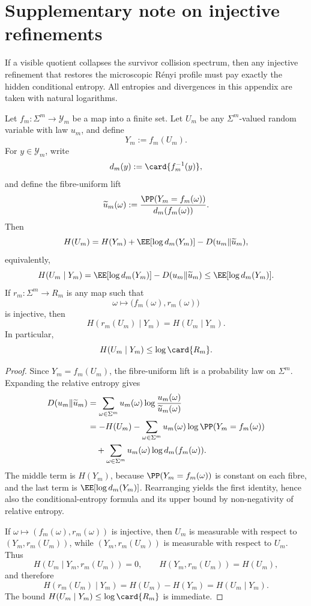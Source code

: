\section{Supplementary note on injective refinements}
\label{app:injective-refinements}

If a visible quotient collapses the survivor collision spectrum, then any
injective refinement that restores the microscopic R\'enyi profile must
pay exactly the hidden conditional entropy.  All entropies and
divergences in this appendix are taken with natural logarithms.

\begin{theorem}
\label{thm:entropy-ledger}
Let \(f_m:\Sigma^m\to \mathcal{Y}_m\) be a map into a finite set.  Let
\(U_m\) be any \(\Sigma^m\)-valued random variable with law \(u_m\), and
define
\[
  Y_m:=f_m(U_m).
\]
For \(y\in \mathcal{Y}_m\), write
\[
  d_m(y):=\card{f_m^{-1}(y)},
\]
and define the fibre-uniform lift
\[
  \widetilde u_m(\omega)
  := \frac{\PP(Y_m=f_m(\omega))}
           {d_m(f_m(\omega))}.
\]
Then
\[
  H(U_m)
  = H(Y_m)+\EE[\log d_m(Y_m)]-D(u_m\Vert \widetilde u_m),
\]
equivalently,
\[
  H(U_m\mid Y_m)
  = \EE[\log d_m(Y_m)]-D(u_m\Vert \widetilde u_m)
  \leq \EE[\log d_m(Y_m)].
\]
If \(r_m:\Sigma^m\to R_m\) is any map such that
\[
  \omega\longmapsto \bigl(f_m(\omega),r_m(\omega)\bigr)
\]
is injective, then
\[
  H(r_m(U_m)\mid Y_m)=H(U_m\mid Y_m).
\]
In particular,
\[
  H(U_m\mid Y_m)\leq \log\card{R_m}.
\]
\end{theorem}

\begin{proof}
Since \(Y_m=f_m(U_m)\), the fibre-uniform lift is a probability law on
\(\Sigma^m\).  Expanding the relative entropy gives
\begin{align*}
  D(u_m\Vert \widetilde u_m)
  &= \sum_{\omega\in\Sigma^m}
      u_m(\omega)\log\frac{u_m(\omega)}{\widetilde u_m(\omega)} \\
  &= -H(U_m)
     - \sum_{\omega\in\Sigma^m}
        u_m(\omega)\log \PP(Y_m=f_m(\omega)) \\
  &\quad
     + \sum_{\omega\in\Sigma^m}
        u_m(\omega)\log d_m(f_m(\omega)).
\end{align*}
The middle term is \(H(Y_m)\), because \(\PP(Y_m=f_m(\omega))\) is
constant on each fibre, and the last term is
\(\EE[\log d_m(Y_m)]\).  Rearranging yields the first identity, hence
also the conditional-entropy formula and its upper bound by
non-negativity of relative entropy.

If \(\omega\mapsto(f_m(\omega),r_m(\omega))\) is injective, then
\(U_m\) is measurable with respect to \((Y_m,r_m(U_m))\), while
\((Y_m,r_m(U_m))\) is measurable with respect to \(U_m\).  Thus
\[
  H(U_m\mid Y_m,r_m(U_m))=0,
  \qquad
  H(Y_m,r_m(U_m))=H(U_m),
\]
and therefore
\[
  H(r_m(U_m)\mid Y_m)=H(U_m)-H(Y_m)=H(U_m\mid Y_m).
\]
The bound \(H(U_m\mid Y_m)\le \log\card{R_m}\) is immediate.
\end{proof}

